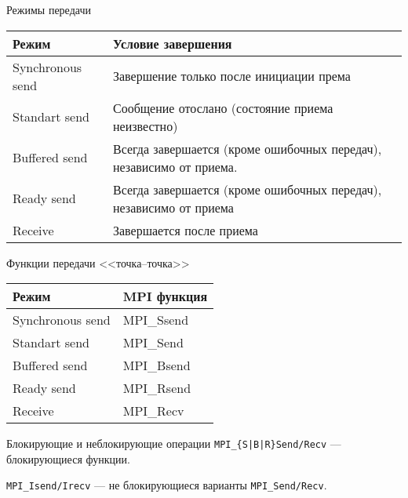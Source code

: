 \begin{frame}{Режимы передачи}
\begin{table}[htpb]
    \begin{center}
    \begin{tabularx}{\textwidth}{|l|X|}
    \hline
    Режим               &   Условие завершения                      \\
    \hline
    \hline
    Synchronous send    &   Завершение только после инициации према \\
    \hline
    Standart send       &   Сообщение отослано (состояние приема неизвестно)    \\
    \hline
    Buffered send       &   Всегда завершается (кроме ошибочных передач), независимо от приема. \\
    \hline
    Ready send          &   Всегда завершается (кроме ошибочных передач), независимо от приема  \\
    \hline
    Receive             &   Завершается после приема                \\
    \hline
    \end{tabularx}
    \end{center}
\end{table}
\end{frame}

\begin{frame}{Функции передачи <<точка--точка>>}
\begin{table}[htpb]
    \begin{center}
    \begin{tabular}{|l|l|}
    \hline
    Режим               &   MPI функция \\
    \hline
    \hline
    Synchronous send    &   MPI_Ssend   \\
    \hline
    Standart send       &   MPI_Send    \\
    \hline
    Buffered send       &   MPI_Bsend   \\
    \hline
    Ready send          &   MPI_Rsend   \\
    \hline
    Receive             &   MPI_Recv    \\
    \hline
    \end{tabular}
    \end{center}
\end{table}
\end{frame}

\begin{frame}{Блокирующие и неблокирующие операции}
\texttt{MPI_\{S|B|R\}Send/Recv} --- блокирующиеся функции.
\begin{figure}
\centering
{}
\end{figure}
\texttt{MPI_Isend/Irecv} --- не блокирующиеся варианты \texttt{MPI_Send/Recv}.
\end{frame}

